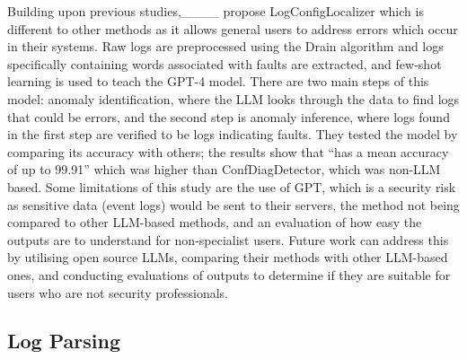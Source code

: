 Building upon previous studies,____ propose LogConfigLocalizer which is different to other methods as it allows general users to address errors which occur in their systems. Raw logs are preprocessed using the Drain algorithm and logs specifically containing words associated with faults are extracted, and few-shot learning is used to teach the GPT-4 model. There are two main steps of this model: anomaly identification, where the LLM looks through the data to find logs that could be errors, and the second step is anomaly inference, where logs found in the first step are verified to be logs indicating faults. They tested the model by comparing its accuracy with others; the results show that ``has a mean accuracy of up to 99.91'' which was higher than ConfDiagDetector, which was non-LLM based. Some limitations of this study are the use of GPT, which is a security risk as sensitive data (event logs) would be sent to their servers, the method not being compared to other LLM-based methods, and an evaluation of how easy the outputs are to understand for non-specialist users. Future work can address this by utilising open source LLMs, comparing their methods with other LLM-based ones, and conducting evaluations of outputs to determine if they are suitable for users who are not security professionals. 

\subsection{Log Parsing}
